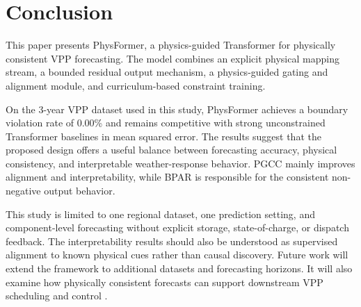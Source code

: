 \section{Conclusion}
\label{sec:conclusion}

This paper presents PhysFormer, a physics-guided Transformer for physically consistent VPP forecasting. The model combines an explicit physical mapping stream, a bounded residual output mechanism, a physics-guided gating and alignment module, and curriculum-based constraint training.

On the 3-year VPP dataset used in this study, PhysFormer achieves a boundary violation rate of 0.00\% and remains competitive with strong unconstrained Transformer baselines in mean squared error. The results suggest that the proposed design offers a useful balance between forecasting accuracy, physical consistency, and interpretable weather-response behavior. PGCC mainly improves alignment and interpretability, while BPAR is responsible for the consistent non-negative output behavior.

This study is limited to one regional dataset, one prediction setting, and component-level forecasting without explicit storage, state-of-charge, or dispatch feedback. The interpretability results should also be understood as supervised alignment to known physical cues rather than causal discovery. Future work will extend the framework to additional datasets and forecasting horizons. It will also examine how physically consistent forecasts can support downstream VPP scheduling and control \cite{Ma2025,Arabzadeh2025,Du2025}.
